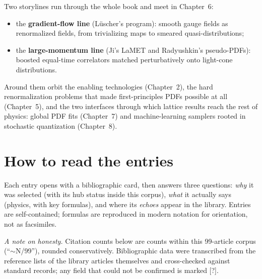Two storylines run through the whole book and meet in Chapter~6:
\begin{itemize}
  \item the \textbf{gradient-flow line} (L\"uscher's program): smooth
        gauge fields as renormalized fields, from trivializing maps to
        smeared quasi-distributions;
  \item the \textbf{large-momentum line} (Ji's LaMET and Radyushkin's
        pseudo-PDFs): boosted equal-time correlators matched perturbatively
        onto light-cone distributions.
\end{itemize}
Around them orbit the enabling technologies (Chapter~2), the hard
renormalization problems that made first-principles PDFs possible at all
(Chapter~5), and the two interfaces through which lattice results reach
the rest of physics: global PDF fits (Chapter~7) and machine-learning
samplers rooted in stochastic quantization (Chapter~8).

\section*{How to read the entries}

Each entry opens with a bibliographic card, then answers three questions:
\emph{why} it was selected (with its hub status inside this corpus),
\emph{what} it actually says (physics, with key formulas), and where its
\emph{echoes} appear in the library. Entries are self-contained; formulas
are reproduced in modern notation for orientation, not as facsimiles.

\bigskip
\noindent\emph{A note on honesty.} Citation counts below are counts within
this 99-article corpus (``$\sim$N/99''), rounded conservatively.
Bibliographic data were transcribed from the reference lists of the
library articles themselves and cross-checked against standard records;
any field that could not be confirmed is marked [?].
